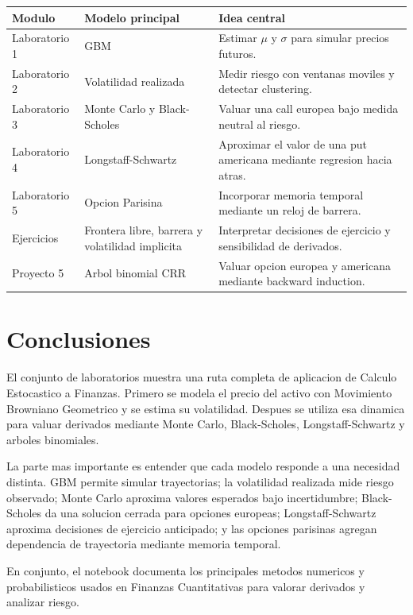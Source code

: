 \documentclass[12pt,a4paper]{article}
\begin{document}
\begin{longtable}{p{3cm}p{5cm}p{6cm}}
\toprule
\textbf{Modulo} & \textbf{Modelo principal} & \textbf{Idea central} \\
\midrule
\endhead
Laboratorio 1 & GBM & Estimar \(\mu\) y \(\sigma\) para simular precios futuros. \\
Laboratorio 2 & Volatilidad realizada & Medir riesgo con ventanas moviles y detectar clustering. \\
Laboratorio 3 & Monte Carlo y Black-Scholes & Valuar una call europea bajo medida neutral al riesgo. \\
Laboratorio 4 & Longstaff-Schwartz & Aproximar el valor de una put americana mediante regresion hacia atras. \\
Laboratorio 5 & Opcion Parisina & Incorporar memoria temporal mediante un reloj de barrera. \\
Ejercicios & Frontera libre, barrera y volatilidad implicita & Interpretar decisiones de ejercicio y sensibilidad de derivados. \\
Proyecto 5 & Arbol binomial CRR & Valuar opcion europea y americana mediante backward induction. \\
\bottomrule
\end{longtable}

\section{Conclusiones}

\begin{interpretacion}
El conjunto de laboratorios muestra una ruta completa de aplicacion de Calculo Estocastico a Finanzas. Primero se modela el precio del activo con Movimiento Browniano Geometrico y se estima su volatilidad. Despues se utiliza esa dinamica para valuar derivados mediante Monte Carlo, Black-Scholes, Longstaff-Schwartz y arboles binomiales.

La parte mas importante es entender que cada modelo responde a una necesidad distinta. GBM permite simular trayectorias; la volatilidad realizada mide riesgo observado; Monte Carlo aproxima valores esperados bajo incertidumbre; Black-Scholes da una solucion cerrada para opciones europeas; Longstaff-Schwartz aproxima decisiones de ejercicio anticipado; y las opciones parisinas agregan dependencia de trayectoria mediante memoria temporal.

En conjunto, el notebook documenta los principales metodos numericos y probabilisticos usados en Finanzas Cuantitativas para valorar derivados y analizar riesgo.
\end{interpretacion}
\end{document}
